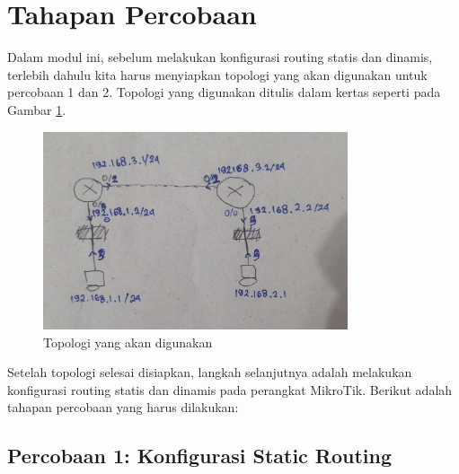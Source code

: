 \section*{Tahapan Percobaan} %

Dalam modul ini, sebelum melakukan konfigurasi routing statis dan dinamis, terlebih dahulu kita harus menyiapkan topologi yang akan digunakan untuk percobaan 1 dan 2. Topologi yang digunakan ditulis dalam kertas seperti pada Gambar \ref{fig:topo}.

\begin{figure}[H]
    \centering
    \includegraphics[width=0.8\textwidth]{img/topologi.jpeg}
    \caption{Topologi yang akan digunakan}
    \label{fig:topo}
\end{figure}

Setelah topologi selesai disiapkan, langkah selanjutnya adalah melakukan konfigurasi routing statis dan dinamis pada perangkat MikroTik. Berikut adalah tahapan percobaan yang harus dilakukan:

\subsection*{Percobaan 1: Konfigurasi Static Routing}

